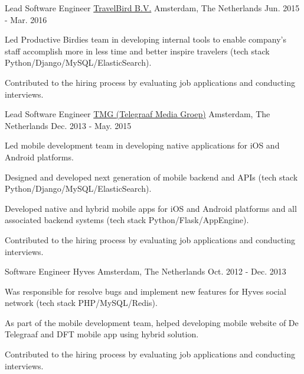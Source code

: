 \begin{cventries}
  \cventry
    {Lead Software Engineer} %
    {\href{https://travelbird.nl/}{TravelBird B.V.}} %
    {Amsterdam, The Netherlands} %
    {Jun. 2015 - Mar. 2016} %
    {
      \begin{cvitems} %
        \item {Led Productive Birdies team in developing internal tools to enable company's staff accomplish more in less time and better inspire travelers (tech stack Python/Django/MySQL/ElasticSearch).}
        \item {Contributed to the hiring process by evaluating job applications and conducting interviews.}
      \end{cvitems}
    }

  \cventry
    {Lead Software Engineer} %
    {\href{https://www.tmg.nl/nl}{TMG (Telegraaf Media Groep)}} %
    {Amsterdam, The Netherlands} %
    {Dec. 2013 - May. 2015} %
    {
      \begin{cvitems} %
        \item {Led mobile development team in developing native applications for iOS and Android platforms.}
        \item {Designed and developed next generation of mobile backend and APIs (tech stack Python/Django/MySQL/ElasticSearch).}
        \item {Developed native and hybrid mobile apps for iOS and Android platforms and all associated backend systems (tech stack Python/Flask/AppEngine).}
        \item {Contributed to the hiring process by evaluating job applications and conducting interviews.}
      \end{cvitems}
    }

  \cventry
    {Software Engineer} %
    {Hyves} %
    {Amsterdam, The Netherlands} %
    {Oct. 2012 - Dec. 2013} %
    {
      \begin{cvitems} %
        \item {Was responsible for resolve bugs and implement new features for Hyves social network (tech stack PHP/MySQL/Redis).}
        \item {As part of the mobile development team, helped developing mobile website of De Telegraaf and DFT mobile app using hybrid solution.}
        \item {Contributed to the hiring process by evaluating job applications and conducting interviews.}
      \end{cvitems}
    }


\end{cventries}
